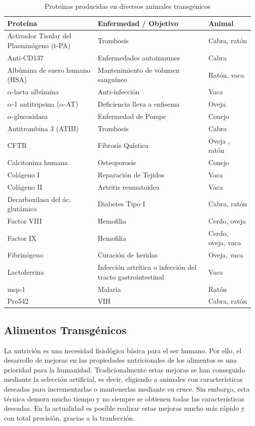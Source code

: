 \documentclass[fleqn,10pt]{SelfArx} %
\begin{document}
\begin{table}[t!]
\centering
\begin{tabular}{l l l} \toprule
\textbf{Proteína} & \textbf{Enfermedad / Objetivo} & \textbf{Animal} \\ \hline
Activador Tisular del Plasminógeno (t-PA) &Trombosis & Cabra, ratón \\ 
Anti-CD137 & Enfermedades autoinmunes & Cabra \\ 
Albúmina de suero humano (HSA) & Mantenimiento de volumen sanguíneo & Ratón, vaca \\
$\alpha$-lacta albúmina & Anti-infección & Vaca \\
$\alpha$-1 antitripsina ($\alpha$-AT) & Deficiencia lleva a enfisema & Oveja \\
$\alpha$-glucosidasa & Enfermedad de Pompe & Conejo \\
Antitrombina 3 (ATIII) & Trombosis & Cabra \\
CFTR & Fibrosis Quística & Oveja , ratón \\ 
Calcitonina humana & Osteoporosis & Conejo \\ 
Colágeno I & Reparación de Tejidos & Vaca \\ 
Colágeno II & Artritis reumatoidea & Vaca \\ 
Decarboxilasa del ác. glutámico & Diabetes Tipo I & Cabra, ratón \\
Factor VIII & Hemofilia & Cerdo, oveja \\ 
Factor IX & Hemofilia & Cerdo, oveja, vaca \\
Fibrinógeno & Curación de heridas & Oveja, vaca \\
Lactoferrina & Infección artrítica o infección del tracto gastrointestinal & Vaca \\ 
msp-1 & Malaria & Ratón \\
Pro542 & VIH & Cabra, ratón \\ \bottomrule
\end{tabular}

\caption{Proteínas producidas en diversos animales transgénicos \cite{Koszarycz2004, niemann2007transgenic, houdebine2009production}}
\label{cuadro1}
\end{table}


\subsection{Alimentos Transgénicos}

La nutrición es una necesidad fisiológica básica para el ser humano\cite{maslow1943theory}. Por ello, el desarrollo de mejoras en las propiedades nutricionales de los alimentos es una prioridad para la humanidad. Tradicionalmente estas mejoras se han conseguido mediante la selección artificial, es decir, eligiendo a animales con características deseadas para incrementarlas o mantenerlas mediante su cruce. Sin embargo, esta técnica demora mucho tiempo y no siempre se obtienen todas las características deseadas. En la actualidad es posible realizar estas mejoras mucho más rápido y con total precisión, gracias a la tranfección.
\end{document}
